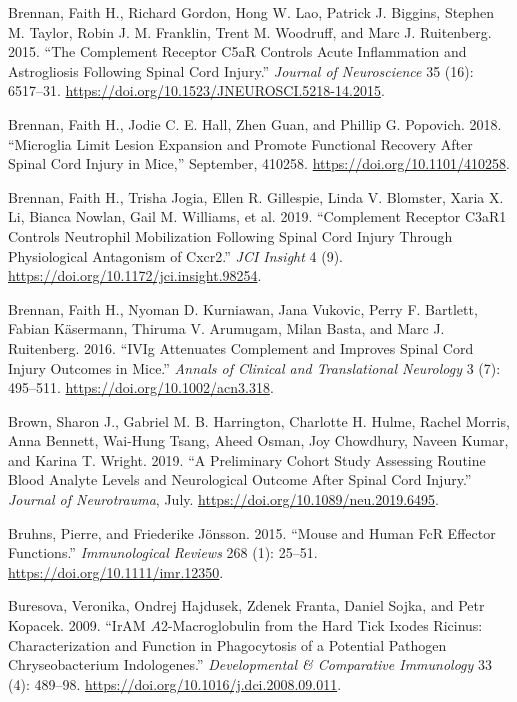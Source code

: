 \documentclass[9pt,lineno]{elife}
\newlength{\cslhangindent}
\newlength{\cslentryspacingunit} %
\newenvironment{CSLReferences}[2] %
 {%
  \setlength{\parindent}{0pt}
  \ifodd #1
  \let\oldpar\par
  \def\par{\hangindent=\cslhangindent\oldpar}
  \fi
  \setlength{\parskip}{#2\cslentryspacingunit}
 }%
 {}
\begin{document}
\begin{CSLReferences}{1}{0}
\leavevmode{}%
Brennan, Faith H., Richard Gordon, Hong W. Lao, Patrick J. Biggins, Stephen M. Taylor, Robin J. M. Franklin, Trent M. Woodruff, and Marc J. Ruitenberg. 2015. {``The {Complement Receptor C5aR Controls Acute Inflammation} and {Astrogliosis} Following {Spinal Cord Injury}.''} \emph{Journal of Neuroscience} 35 (16): 6517--31. \url{https://doi.org/10.1523/JNEUROSCI.5218-14.2015}.

\leavevmode{}%
Brennan, Faith H., Jodie C. E. Hall, Zhen Guan, and Phillip G. Popovich. 2018. {``Microglia Limit Lesion Expansion and Promote Functional Recovery After Spinal Cord Injury in Mice,''} September, 410258. \url{https://doi.org/10.1101/410258}.

\leavevmode{}%
Brennan, Faith H., Trisha Jogia, Ellen R. Gillespie, Linda V. Blomster, Xaria X. Li, Bianca Nowlan, Gail M. Williams, et al. 2019. {``Complement Receptor {C3aR1} Controls Neutrophil Mobilization Following Spinal Cord Injury Through Physiological Antagonism of {Cxcr2}.''} \emph{JCI Insight} 4 (9). \url{https://doi.org/10.1172/jci.insight.98254}.

\leavevmode{}%
Brennan, Faith H., Nyoman D. Kurniawan, Jana Vukovic, Perry F. Bartlett, Fabian Käsermann, Thiruma V. Arumugam, Milan Basta, and Marc J. Ruitenberg. 2016. {``{IVIg} Attenuates Complement and Improves Spinal Cord Injury Outcomes in Mice.''} \emph{Annals of Clinical and Translational Neurology} 3 (7): 495--511. \url{https://doi.org/10.1002/acn3.318}.

\leavevmode{}%
Brown, Sharon J., Gabriel M. B. Harrington, Charlotte H. Hulme, Rachel Morris, Anna Bennett, Wai-Hung Tsang, Aheed Osman, Joy Chowdhury, Naveen Kumar, and Karina T. Wright. 2019. {``A Preliminary Cohort Study Assessing Routine Blood Analyte Levels and Neurological Outcome After Spinal Cord Injury.''} \emph{Journal of Neurotrauma}, July. \url{https://doi.org/10.1089/neu.2019.6495}.

\leavevmode{}%
Bruhns, Pierre, and Friederike Jönsson. 2015. {``Mouse and Human {FcR} Effector Functions.''} \emph{Immunological Reviews} 268 (1): 25--51. \url{https://doi.org/10.1111/imr.12350}.

\leavevmode{}%
Buresova, Veronika, Ondrej Hajdusek, Zdenek Franta, Daniel Sojka, and Petr Kopacek. 2009. {``{IrAM} {\(A\)}2-Macroglobulin from the Hard Tick {Ixodes} Ricinus: {Characterization} and Function in Phagocytosis of a Potential Pathogen {Chryseobacterium} Indologenes.''} \emph{Developmental \& Comparative Immunology} 33 (4): 489--98. \url{https://doi.org/10.1016/j.dci.2008.09.011}.


\end{CSLReferences}
\end{document}

